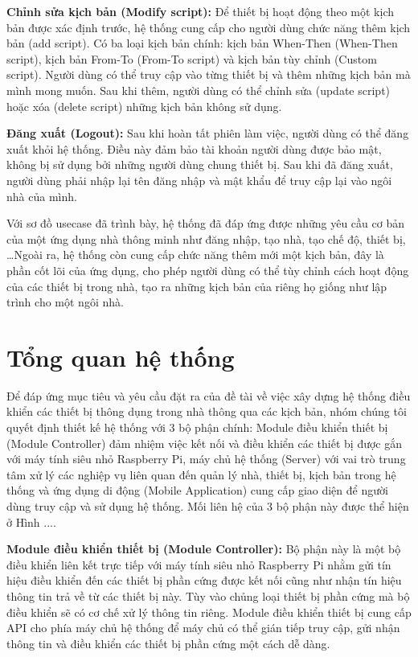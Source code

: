 \documentclass[12pt,a4paper,oneside]{extbook}
\begin{document}
\textbf{Chỉnh sửa kịch bản (Modify script):} Để thiết bị hoạt động theo một kịch bản được xác định trước, hệ thống cung cấp cho người dùng chức năng thêm kịch bản (add script). Có ba loại kịch bản chính: kịch bản When-Then (When-Then script), kịch bản From-To (From-To script) và kịch bản tùy chỉnh (Custom script). Người dùng có thể truy cập vào từng thiết bị và thêm những kịch bản mà mình mong muốn. Sau khi thêm, người dùng có thể chỉnh sửa (update script) hoặc xóa (delete script) những kịch bản không sử dụng.

\textbf{Đăng xuất (Logout):} Sau khi hoàn tất phiên làm việc, người dùng có thể đăng xuất khỏi hệ thống. Điều này đảm bảo tài khoản người dùng được bảo mật, không bị sử dụng bởi những người dùng chung thiết bị. Sau khi đã đăng xuất, người dùng phải nhập lại tên đăng nhập và mật khẩu để truy cập lại vào ngôi nhà của mình.

Với sơ đồ usecase đã trình bày, hệ thống đã đáp ứng được những yêu cầu cơ bản của một ứng dụng nhà thông minh như đăng nhập, tạo nhà, tạo chế độ, thiết bị, …Ngoài ra, hệ thống còn cung cấp chức năng thêm mới một kịch bản, đây là phần cốt lõi của ứng dụng, cho phép người dùng có thể tùy chỉnh cách hoạt động của các thiết bị trong nhà, tạo ra những kịch bản của riêng họ giống như lập trình cho một ngôi nhà.

\section{Tổng quan hệ thống}

Để đáp ứng mục tiêu và yêu cầu đặt ra của đề tài về việc xây dựng hệ thống điều khiển các thiết bị thông dụng trong nhà thông qua các kịch bản, nhóm chúng tôi quyết định thiết kế hệ thống với 3 bộ phận chính: Module điều khiển thiết bị (Module Controller) đảm nhiệm việc kết nối và điều khiển các thiết bị được gắn với máy tính siêu nhỏ Raspberry Pi, máy chủ hệ thống (Server) với vai trò trung tâm xử lý các nghiệp vụ liên quan đến quản lý nhà, thiết bị, kịch bản trong hệ thống và ứng dụng di động (Mobile Application) cung cấp giao diện để người dùng truy cập và sử dụng hệ thống. Mối liên hệ của 3 bộ phận này được thể hiện ở Hình ....

\textbf{Module điều khiển thiết bị (Module Controller):} Bộ phận này là một bộ điều khiển liên kết trực tiếp với máy tính siêu nhỏ Raspberry Pi nhằm gửi tín hiệu điều khiển đến các thiết bị phần cứng được kết nối cũng như nhận tín hiệu thông tin trả về từ các thiết bị này. Tùy vào chủng loại thiết bị phần cứng mà bộ điều khiển sẽ có cơ chế xử lý thông tin riêng. Module điều khiển thiết bị cung cấp API cho phía máy chủ hệ thống để máy chủ có thể gián tiếp truy cập, gửi nhận thông tin và điều khiển các thiết bị phần cứng một cách dễ dàng.
\end{document}
